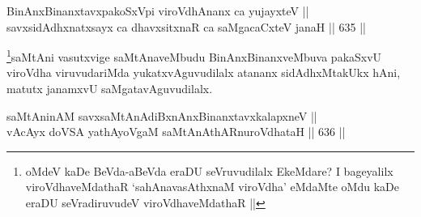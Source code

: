 
\begin{shl}
BinAnxBinanxtavxpakoSxV\s pi viroVdhAnanx ca yujayxteV || \\
savxsidAdhxnatxsayx ca dhavxsitxnaR ca saMgacaCxteV janaH ||  635 ||  
\end{shl}

\begin{artha}
\footnote{oMdeV kaDe BeVda-aBeVda eraDU seVruvudilalx EkeMdare? I bageyalilx viroVdhaveMdathaR `sahAnavasAthxnaM viroVdha' eMdaMte oMdu kaDe eraDU seVradiruvudeV viroVdhaveMdathaR ||}saMtAni vasutxvige saMtAnaveMbudu BinAnxBinanxveMbuva pakaSxvU viroVdha viruvudariMda yukatxvAguvudilalx atananx sidAdhxMtakUkx hAni, matutx janamxvU saMgatavAguvudilalx.
\end{artha}

\begin{shl}
saMtAninAM savxsaMtAnAdiBxnAnxBinanxtavxkalapxneV || \\
vAcAyx doVSA yathAyoVgaM saMtAnAthARnuroVdhataH  ||  636 ||  
\end{shl}

